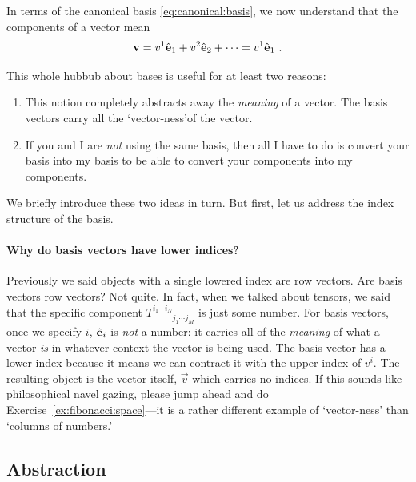 In terms of the canonical basis \eqref{eq:canonical:basis}, we now understand that the components of a vector mean
\begin{align}
    \mathbf{v} = v^1 \hat{\mathbf{e}}_1 + v^2 \hat{\mathbf{e}}_2 + \cdots = v^1 \hat{\mathbf{e}}_1 \ .
\end{align}

\begin{bigidea}\label{idea:reasons:to:like:bases}
This whole hubbub about bases is useful for at least two reasons:
\begin{enumerate}
    \item This notion completely abstracts away the \emph{meaning} of a vector. The basis vectors carry all the `vector-ness'\sidenotemark of the vector. 
    \item If you and I are \emph{not} using the same basis, then all I have to do is convert your basis into my basis to be able to convert your components into my components.
\end{enumerate}
\end{bigidea}

We briefly introduce these two ideas in turn. But first, let us address the index structure of the basis.

\paragraph{Why do basis vectors have lower indices?} Previously we said objects with a single lowered index are row vectors. Are basis vectors row vectors? Not quite. In fact, when we talked about tensors, we said that the specific component $T^{i_1\cdots i_N}_{\phantom{{i_1\cdots i_N}}j_1\cdots j_M}$ is just some number. For basis vectors, once we specify $i$, $\hat{\mathbf{e}}_i$ is \emph{not} a number: it carries all of the \emph{meaning} of what a vector \emph{is} in whatever context the vector is being used. The basis vector has a lower index because it means we can contract it with the upper index of $v^i$. The resulting object is the vector itself, $\vec{v}$ which carries no indices. If this sounds like philosophical navel gazing, please jump ahead and do Exercise~\ref{ex:fibonacci:space}---it is a rather different example of `vector-ness' than `columns of numbers.'





\subsection{Abstraction}
\label{sec:sub:abstraction:basis}


